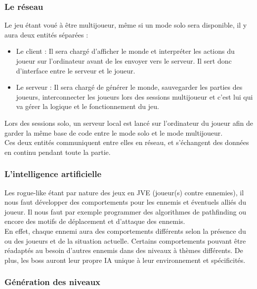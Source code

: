 \documentclass{article}
\begin{document}
\subsubsection{Le réseau}

Le jeu étant voué à être multijoueur, même si un mode solo sera disponible, il y aura deux entités séparées :

\begin{itemize}
    \item Le client :  Il sera chargé d'afficher le monde et interpréter les actions du joueur sur l'ordinateur avant de les envoyer vers le serveur. Il sert donc d'interface entre le serveur et le joueur.
    
    \item Le serveur : Il sera chargé de générer le monde, sauvegarder les parties des joueurs, interconnecter les joueurs lors des sessions multijoueur et c'est lui qui va gérer la logique et le fonctionnement du jeu.
\end{itemize}

Lors des sessions solo, un serveur local est lancé sur l'ordinateur du joueur afin de garder la même base de code entre le mode solo et le mode multijoueur. \\
Ces deux entités communiquent entre elles en réseau, et s'échangent des données en continu pendant toute la partie.

\subsubsection{L'intelligence artificielle}

Les rogue-like étant par nature des jeux en JVE (joueur(s) contre ennemies), il nous faut développer des comportements pour les ennemis et éventuels alliés du joueur. Il nous faut par exemple programmer des algorithmes de pathfinding ou encore des motifs de déplacement et d'attaque des ennemis. \\
En effet, chaque ennemi aura des comportements différents selon la présence du ou des joueurs et de la situation actuelle. Certains comportements pouvant être réadaptés au besoin d'autres ennemis dans des niveaux à thèmes différents. De plus, les boss auront leur propre IA unique à leur environnement et spécificités.

\subsubsection{Génération des niveaux}
\end{document}
